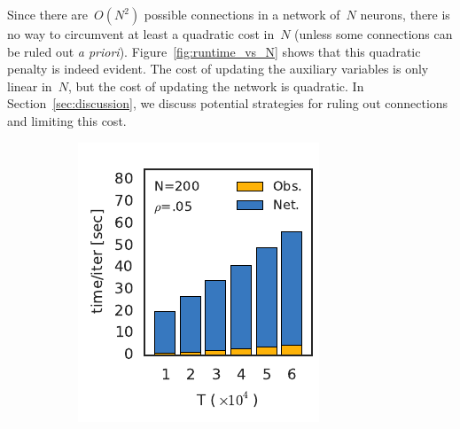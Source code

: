 Since there are~$O(N^2)$ possible connections in a network of~$N$
neurons, there is no way to circumvent at least a quadratic cost
in~$N$ (unless some connections can be ruled out \textit{a priori}).
Figure~\ref{fig:runtime_vs_N} shows that this quadratic penalty is
indeed evident. The cost of updating the auxiliary variables is only
linear in~$N$, but the cost of updating the network is quadratic. In
Section~\ref{sec:discussion}, we discuss potential strategies for
ruling out connections and limiting this cost.


\begin{figure}[t!]
  \centering
  \vspace{-.2in}
  \begin{subfigure}[b]{1.81in}
    \centering
    \caption{}
    \vspace{-.25in}
    \includegraphics[width=\textwidth]{figures/ch5/runtime_vs_T.pdf}
    \label{fig:runtime_vs_T}
  \end{subfigure}
  ~
  \begin{subfigure}[b]{2.17in}
    \centering
    \caption{}
    \vspace{-.25in}

\end{subfigure}
\end{figure}
